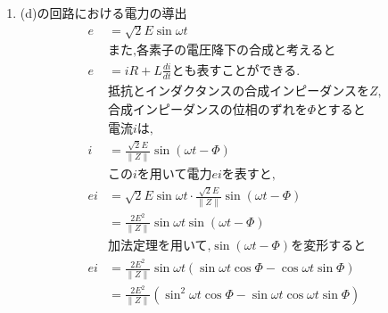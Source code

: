 \documentclass[twocolumn]{article}
\begin{document}
\begin{enumerate}
  \item (d)の回路における電力の導出
        \begin{align*}
          e    & =\sqrt{2}E\sin\omega t                                                                                                             \\
               & \text{また,各素子の電圧降下の合成と考えると}                                                                                                         \\
          e    & =iR + L \frac{di}{dt} \text{とも表すことができる.}                                                                                           \\
               & \text{抵抗とインダクタンスの合成インピーダンスを} Z \text{,}                                                                                            \\
               & \text{合成インピーダンスの位相のずれを} \Phi \text{とすると}                                                                                           \\
               & \text{電流} i \text{は,}                                                                                                              \\
          i    & = \frac{\sqrt{2}E}{\|Z\|} \sin \left( \omega t - \Phi\right)                                                                       \\
               & \text{この} i \text{を用いて電力} ei \text{を表すと,}                                                                                          \\
          ei   & = \sqrt{2}E\sin\omega t \cdot \frac{\sqrt{2}E}{\|Z\|} \sin \left( \omega t - \Phi\right)                                           \\
               & = \frac{2E^2}{\|Z\|}\sin\omega t \sin \left(\omega t - \Phi\right)                                                                 \\
               & \text{加法定理を用いて,}\sin \left(\omega t - \Phi\right) \text{を変形すると}                                                                    \\
          ei   & = \frac{2E^2}{\|Z\|}\sin\omega t \left(\sin\omega t \cos \Phi - \cos\omega t \sin \Phi\right)                                      \\
               & = \frac{2E^2}{\|Z\|} \left(\sin^2 \omega t \cos \Phi - \sin\omega t \cos\omega t \sin \Phi\right)                                  \\

\end{align*}
\end{enumerate}
\end{document}
